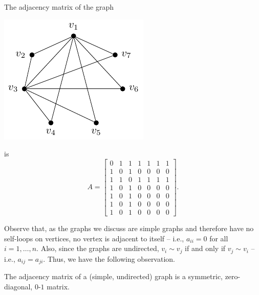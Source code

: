 \begin{Example}\label{ex:GNM(6-11)AdjMat}
The adjacency matrix of the graph
\begin{center}
\includegraphics{GNM(6,11).pdf}
\end{center}
is
\begin{equation*}
A = \begin{bmatrix}
0 & 1 & 1 & 1 & 1 & 1 & 1 \\
1 & 0 & 1 & 0 & 0 & 0 & 0 \\
1 & 1 & 0 & 1 & 1 & 1 & 1 \\
1 & 0 & 1 & 0 & 0 & 0 & 0 \\
1 & 0 & 1 & 0 & 0 & 0 & 0 \\
1 & 0 & 1 & 0 & 0 & 0 & 0 \\
1 & 0 & 1 & 0 & 0 & 0 & 0
\end{bmatrix}.
\end{equation*}
\end{Example}

Observe that, as the graphs we discuss are simple graphs and therefore have no self-loops on vertices, no vertex is adjacent to itself -- i.e., $a_{ii} = 0$ for all $i = 1, \ldots, n$. Also, since the graphs are undirected, $v_i \sim v_j$ if and only if $v_j \sim v_i$ -- i.e., $a_{ij} = a_{ji}$. Thus, we have the following observation.

\begin{Observation}
The adjacency matrix of a (simple, undirected) graph is a symmetric, zero-diagonal, $0$-$1$ matrix.
\end{Observation}

